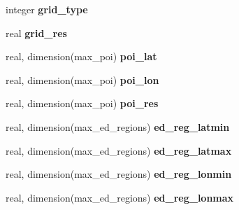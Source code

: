 \begin{DoxyCompactItemize}
\item 
\hypertarget{structename__coms_1_1ename__vars_aaae042470167d9e8c1e6a8685bb3193d}{
integer {\bfseries grid\_\-type}}
\label{structename__coms_1_1ename__vars_aaae042470167d9e8c1e6a8685bb3193d}

\item 
\hypertarget{structename__coms_1_1ename__vars_a3844568a87246202c0f3195a036dd962}{
real {\bfseries grid\_\-res}}
\label{structename__coms_1_1ename__vars_a3844568a87246202c0f3195a036dd962}

\item 
\hypertarget{structename__coms_1_1ename__vars_acad48a76aebd6d115f399dc5002d7d72}{
real, dimension(max\_\-poi) {\bfseries poi\_\-lat}}
\label{structename__coms_1_1ename__vars_acad48a76aebd6d115f399dc5002d7d72}

\item 
\hypertarget{structename__coms_1_1ename__vars_a17e8ce1874db385a6c8ed7c2c719754c}{
real, dimension(max\_\-poi) {\bfseries poi\_\-lon}}
\label{structename__coms_1_1ename__vars_a17e8ce1874db385a6c8ed7c2c719754c}

\item 
\hypertarget{structename__coms_1_1ename__vars_a5af4b29c2ee8be83ad3870f237560370}{
real, dimension(max\_\-poi) {\bfseries poi\_\-res}}
\label{structename__coms_1_1ename__vars_a5af4b29c2ee8be83ad3870f237560370}

\item 
\hypertarget{structename__coms_1_1ename__vars_a6779037f98b9666e341cac86c12a8316}{
real, dimension(max\_\-ed\_\-regions) {\bfseries ed\_\-reg\_\-latmin}}
\label{structename__coms_1_1ename__vars_a6779037f98b9666e341cac86c12a8316}

\item 
\hypertarget{structename__coms_1_1ename__vars_a8f718c96c31a196f6ead70ba6023f11c}{
real, dimension(max\_\-ed\_\-regions) {\bfseries ed\_\-reg\_\-latmax}}
\label{structename__coms_1_1ename__vars_a8f718c96c31a196f6ead70ba6023f11c}

\item 
\hypertarget{structename__coms_1_1ename__vars_a51cc402ef672323f6f7bc6b937be69a4}{
real, dimension(max\_\-ed\_\-regions) {\bfseries ed\_\-reg\_\-lonmin}}
\label{structename__coms_1_1ename__vars_a51cc402ef672323f6f7bc6b937be69a4}

\item 
\hypertarget{structename__coms_1_1ename__vars_aaa85410d038e504fb688cdceb0b30f68}{
real, dimension(max\_\-ed\_\-regions) {\bfseries ed\_\-reg\_\-lonmax}}
\label{structename__coms_1_1ename__vars_aaa85410d038e504fb688cdceb0b30f68}


\end{DoxyCompactItemize}
